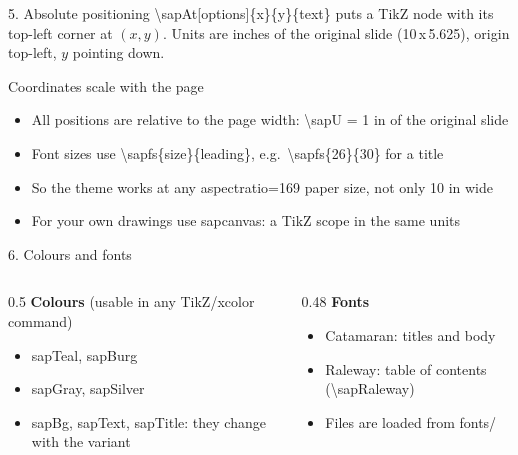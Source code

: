 \documentclass[t,aspectratio=169]{beamer}
\newcommand{\code}[1]{{\ttfamily\small #1}}
\begin{document}
\begin{frame}{5. Absolute positioning}
  \small
  \code{\textbackslash sapAt[options]\{x\}\{y\}\{text\}} puts a TikZ node with its top-left corner at $(x,y)$.
  Units are inches of the original slide (10\,x\,5.625), origin top-left, $y$ pointing down.
\end{frame}

\begin{frame}{Coordinates scale with the page}
  \begin{itemize}
    \item All positions are relative to the page width: \code{\textbackslash sapU} = 1 in of the original slide
    \item Font sizes use \code{\textbackslash sapfs\{size\}\{leading\}}, e.g.\ \code{\textbackslash sapfs\{26\}\{30\}} for a title
    \item So the theme works at any \code{aspectratio=169} paper size, not only 10 in wide
    \item For your own drawings use \code{sapcanvas}: a TikZ scope in the same units
  \end{itemize}
\end{frame}

\begin{frame}{6. Colours and fonts}
  \begin{columns}[T]
    \begin{column}{0.5\textwidth}
      \textbf{Colours} (usable in any TikZ/xcolor command)
      \begin{itemize}
        \item \textcolor{sapTeal}{\code{sapTeal}}, \textcolor{sapBurg}{\code{sapBurg}}
        \item \code{sapGray}, \code{sapSilver}
        \item \code{sapBg}, \code{sapText}, \code{sapTitle}: they change with the variant
      \end{itemize}
    \end{column}
    \begin{column}{0.48\textwidth}
      \textbf{Fonts}
      \begin{itemize}
        \item Catamaran: titles and body
        \item {\sapRaleway Raleway}: table of contents (\code{\textbackslash sapRaleway})
        \item Files are loaded from \code{fonts/}
      \end{itemize}
    \end{column}
  \end{columns}
\end{frame}
\end{document}

